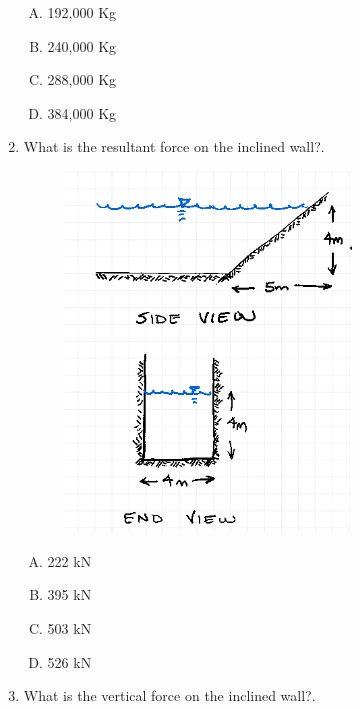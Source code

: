\documentclass[12pt]{article}
\begin{document}
\begin{enumerate}
\begin{enumerate}[A)]
\item 192,000 Kg
\item 240,000 Kg
\item 288,000 Kg
\item 384,000 Kg
\end{enumerate}
\clearpage

\item What is the resultant force on the inclined wall?.

\begin{figure}[htbp] %
   \centering
   \includegraphics[width=3in]{slopedSide.png} 
   \caption{}
   \label{fig:gate}
\end{figure}

\begin{enumerate}[A)]
\item 222 kN
\item 395 kN
\item 503 kN
\item 526 kN
\end{enumerate}
\clearpage

\item What is the vertical force on the inclined wall?.


\end{enumerate}
\end{document}
